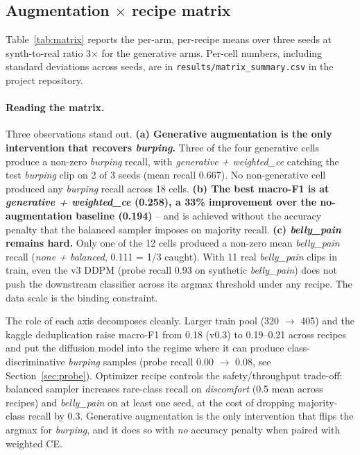 \documentclass[final]{article}
\begin{document}
\subsection{Augmentation $\times$ recipe matrix}\label{sec:matrix}
Table~\ref{tab:matrix} reports the per-arm, per-recipe means over three seeds at synth-to-real ratio 3$\times$ for the generative arms. Per-cell numbers, including standard deviations across seeds, are in \texttt{results/matrix\_summary.csv} in the project repository.

\paragraph{Reading the matrix.} Three observations stand out.
\textbf{(a) Generative augmentation is the only intervention that recovers \textit{burping}.} Three of the four generative cells produce a non-zero \textit{burping} recall, with \textit{generative + weighted\_ce} catching the test \textit{burping} clip on 2 of 3 seeds (mean recall 0.667). No non-generative cell produced any \textit{burping} recall across 18 cells. \textbf{(b) The best macro-F1 is at \textit{generative + weighted\_ce} (0.258), a 33\% improvement over the no-augmentation baseline (0.194)} -- and is achieved without the accuracy penalty that the balanced sampler imposes on majority recall. \textbf{(c) \textit{belly\_pain} remains hard.} Only one of the 12 cells produced a non-zero mean \textit{belly\_pain} recall (\textit{none + balanced}, 0.111 = 1/3 caught). With 11 real \textit{belly\_pain} clips in train, even the v3 DDPM (probe recall 0.93 on synthetic \textit{belly\_pain}) does not push the downstream classifier across its argmax threshold under any recipe. The data scale is the binding constraint.

The role of each axis decomposes cleanly. Larger train pool (320 $\to$ 405) and the kaggle deduplication raise macro-F1 from 0.18 (v0.3) to 0.19--0.21 across recipes and put the diffusion model into the regime where it can produce class-discriminative \textit{burping} samples (probe recall 0.00 $\to$ 0.08, see Section~\ref{sec:probe}). Optimizer recipe controls the safety/throughput trade-off: balanced sampler increases rare-class recall on \textit{discomfort} (0.5 mean across recipes) and \textit{belly\_pain} on at least one seed, at the cost of dropping majority-class recall by 0.3. Generative augmentation is the only intervention that flips the argmax for \textit{burping}, and it does so with \emph{no} accuracy penalty when paired with weighted CE.
\end{document}
